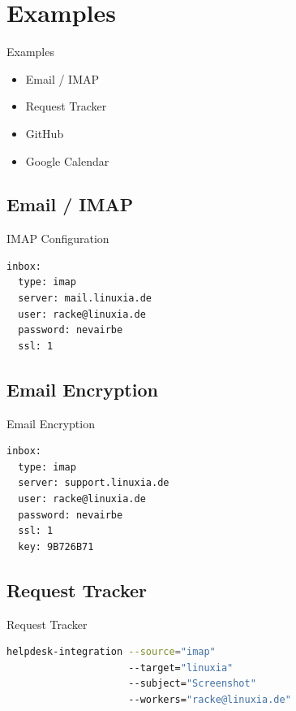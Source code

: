 \section{Examples}

\begin{frame}{Examples}
\begin{itemize}
\item Email / IMAP
\item Request Tracker
\item GitHub
\item Google Calendar
\end{itemize}
\end{frame}

\subsection{Email / IMAP}

\begin{frame}[fragile]{IMAP Configuration}
\begin{lstlisting}
inbox:
  type: imap
  server: mail.linuxia.de
  user: racke@linuxia.de
  password: nevairbe
  ssl: 1
\end{lstlisting}
\end{frame}

\subsection{Email Encryption}
\begin{frame}[fragile]{Email Encryption}
\begin{lstlisting}
inbox:
  type: imap
  server: support.linuxia.de
  user: racke@linuxia.de
  password: nevairbe
  ssl: 1
  key: 9B726B71
\end{lstlisting}
\end{frame}

\subsection{Request Tracker}
\begin{frame}[fragile]{Request Tracker}

\begin{lstlisting}[language=bash]
helpdesk-integration --source="imap" 
                     --target="linuxia" 
                     --subject="Screenshot"
                     --workers="racke@linuxia.de"
\end{lstlisting}
\end{frame}

